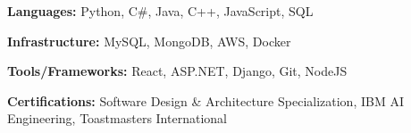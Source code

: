 \begin{siderulesSos}
\begin{skillSection}
\cvskillentry
    {
      \begin{cvsositems}
        \item {\color{black}\textbf{Languages:} Python, C\#, Java, C++, JavaScript, SQL}
        \item {\color{black}\textbf{Infrastructure:} MySQL, MongoDB, AWS, Docker }
        \item {\color{black}\textbf{Tools/Frameworks:} React, ASP.NET, Django, Git, NodeJS}
        \item {\color{black}\textbf{Certifications:} Software Design \& Architecture Specialization, IBM AI Engineering, Toastmasters International}
      \end{cvsositems}
    }
\end{skillSection}
\end{siderulesSos}